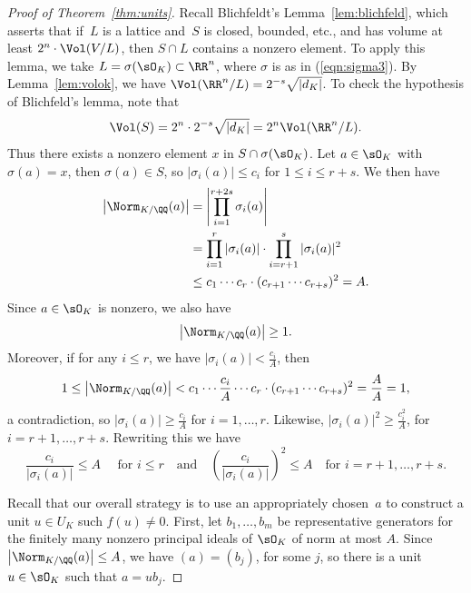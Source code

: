 \begin{proof}[Proof of Theorem~\ref{thm:units}]
  Recall Blichfeldt's Lemma~\ref{lem:blichfeld}, which asserts
  that if~$L$ is a lattice and~$S$ is closed, bounded, etc., and has volume
  at least $2^n\cdot \Vol(V/L)$, then $S\cap L$ contains a nonzero element.
  To apply this lemma, we take $L=\sigma(\sO_K)\subset \RR^n$, where $\sigma$
  is as in (\ref{eqn:sigma3}). By Lemma~\ref{lem:volok}, we have
  $\Vol(\RR^n/L) = 2^{-s}\sqrt{|d_K|}$. To check the hypothesis of
  Blichfeld's lemma, note that
  \[
    \Vol(S) = 2^n \cdot 2^{-s} \sqrt{|d_K|} = 2^n \Vol(\RR^n/L).
  \]
  Thus there exists a nonzero element $x$ in $S\cap \sigma(\sO_K)$.
  Let $a\in \sO_K$ with $\sigma(a)=x$, then $\sigma(a)\in S$, so
  $|\sigma_i(a)|\leq c_i$ for $1\leq i\leq r+s$. We then have
  \begin{align*}
    \left|\Norm_{K/\QQ}(a)\right|
    &= \left|\prod_{i=1}^{r+2s} \sigma_i(a)\right|
    \\
    &= \prod_{i=1}^r |\sigma_i(a)|\cdot \prod_{i=r+1}^s|\sigma_i(a)|^2
    \\
    &\leq c_1\cdots c_r\cdot (c_{r+1}\cdots c_{r+s})^2 = A.
  \end{align*}
  Since $a\in \sO_K$ is nonzero, we also have
  \[
    \left|\Norm_{K/\QQ}(a)\right|\geq 1.
  \]
  Moreover, if for any $i\leq r$, we have $|\sigma_i(a)|< \frac{c_i}{A}$, then
  \[
    1
    \leq \left|\Norm_{K/\QQ}(a)\right|
    < c_1\cdots \frac{c_i}{A}\cdots c_r \cdot (c_{r+1}\cdots c_{r+s})^2
    = \frac{A}{A} = 1,
  \]
  a contradiction, so $|\sigma_i(a)|\geq \frac{c_i}{A}$ for $i=1,\dots, r$.
  Likewise, $|\sigma_i(a)|^2 \geq \frac{c_i^2}{A}$, for $i=r+1,\dots, r+s$.
  Rewriting this we have
  \begin{equation}\label{eqn:cisigbound}
    \frac{c_i}{|\sigma_i(a)|}\leq A\quad\text{ for }i\leq r
    \quad\text{and}\quad
    \left(\frac{c_i}{|\sigma_i(a)|}\right)^2
    \leq A\quad\text{for } i=r+1,\dots, r+s.
  \end{equation}

  Recall that our overall strategy is to use an appropriately chosen~$a$
  to construct a unit $u\in U_K$ such $f(u)\neq 0$.  First, let
  $b_1,\dots, b_m$ be representative generators for the finitely many
  nonzero principal ideals of $\sO_K$ of norm at most $A$.  Since
  $\left|\Norm_{K/\QQ}(a)\right|\leq A$, we have $(a)=(b_j)$, for some $j$, so there
  is a unit~$u\in \sO_K$ such that $a=u b_j$.


\end{proof}

